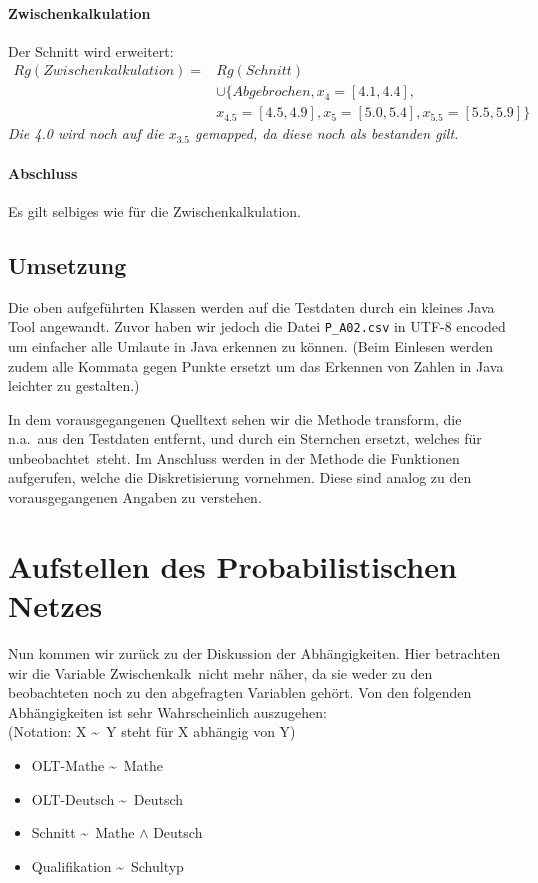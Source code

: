 \paragraph{Zwischenkalkulation} Der Schnitt wird erweitert: 
\begin{equation*}
\begin{split}
Rg(Zwischenkalkulation) = & Rg(Schnitt) \\
							& \cup \{Abgebrochen, x_{4}=[4.1,4.4], \\
							& x_{4.5}=[4.5,4.9],  x_{5}=[5.0,5.4], x_{5.5}=[5.5,5.9]\}
\end{split}
\end{equation*}
\textit{Die 4.0 wird noch auf die $x_{3.5}$ gemapped, da diese noch als bestanden gilt.}

\paragraph{Abschluss} Es gilt selbiges wie für die Zwischenkalkulation. 

\subsection*{Umsetzung}
Die oben aufgeführten Klassen werden auf die Testdaten durch ein kleines Java Tool angewandt. Zuvor haben wir jedoch die Datei \lstinline{P_A02.csv} in UTF-8 encoded um einfacher alle Umlaute in Java erkennen zu können. (Beim Einlesen werden zudem alle Kommata gegen Punkte ersetzt um das Erkennen von Zahlen in Java leichter zu gestalten.)




In dem vorausgegangenen Quelltext sehen wir die Methode \glqq transform\grqq, die \glqq n.a.\grqq \  aus den Testdaten entfernt, und durch ein Sternchen ersetzt, welches für \glqq unbeobachtet\grqq \ steht. Im Anschluss werden in der Methode die Funktionen aufgerufen, welche die Diskretisierung vornehmen. Diese sind analog zu den vorausgegangenen Angaben zu verstehen. 



\section{Aufstellen des Probabilistischen Netzes}\label{erstellen}

Nun kommen wir zurück zu der Diskussion der Abhängigkeiten. Hier betrachten wir die Variable \glqq Zwischenkalk\grqq \ nicht mehr näher, da sie weder zu den beobachteten noch zu den abgefragten Variablen gehört. 
Von den folgenden Abhängigkeiten ist sehr Wahrscheinlich auszugehen:\\
(Notation: X  \textasciitilde \ Y steht für X abhängig von Y)
\begin{itemize}
	\item OLT-Mathe \textasciitilde \ Mathe
	\item OLT-Deutsch \textasciitilde  \ Deutsch
	\item Schnitt \textasciitilde \  Mathe $\wedge$ Deutsch
	\item Qualifikation \textasciitilde \ Schultyp
\end{itemize}

